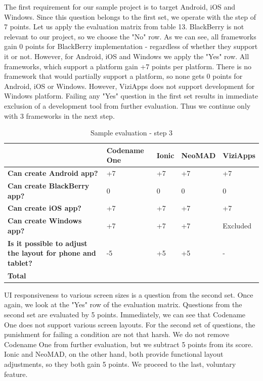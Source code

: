 \documentclass[english,master,public,dept460,male,cpdeclaration,oneside]{diploma}
\begin{document}
The first requirement for our sample project is to target Android, iOS and Windows. Since this question belongs to the first set, we operate with the step of 7 points. Let us apply the evaluation matrix from table 13. BlackBerry is not relevant to our project, so we choose the "No" row. As we can see, all frameworks gain 0 points for BlackBerry implementation - regardless of whether they support it or not. However, for Android, iOS and Windows we apply the "Yes" row. All frameworks, which support a platform gain +7 points per platform. There is no framework that would partially support a platform, so none gets 0 points for Android, iOS or Windows. However, ViziApps does not support development for Windows platform. Failing any "Yes" question in the first set results in immediate exclusion of a development tool from further evaluation. Thus we continue only with 3 frameworks in the next step.

\begin{table}[!h]
	\centering
	\caption{Sample evaluation - step 3}
	\begin{tabular}{p{2.5cm} | p{2.5cm} | p{2.5cm} | p{2.5cm} | p{2.5cm}}
		\toprule
		& \textbf{Codename One} & \textbf{Ionic} & \textbf{NeoMAD} & \textbf{ViziApps} \\
		\midrule
		\textbf{Can create Android app?} & +7 & +7 & +7 & +7 \\
		\textbf{Can create BlackBerry app?} & 0 & 0 & 0 & 0 \\
		\textbf{Can create iOS app?} & +7 & +7 & +7 & +7 \\
		\textbf{Can create Windows app?} & +7 & +7 & +7 & Excluded \\
		\midrule
		\textbf{Is it possible to adjust the layout for phone and tablet?} & -5 & +5 & +5 & - \\
		\midrule
		\textbf{Total} &&&& \\
		\midrule
	\end{tabular}
\end{table}

UI responsiveness to various screen sizes is a question from the second set. Once again, we look at the "Yes" row of the evaluation matrix. Questions from the second set are evaluated by 5 points. Immediately, we can see that Codename One does not support various screen layouts. For the second set of questions, the punishment for failing a condition are not that harsh. We do not remove Codename One from further evaluation, but we subtract 5 points from its score. Ionic and NeoMAD, on the other hand, both provide functional layout adjustments, so they both gain 5 points. We proceed to the last, voluntary feature.
\end{document}
